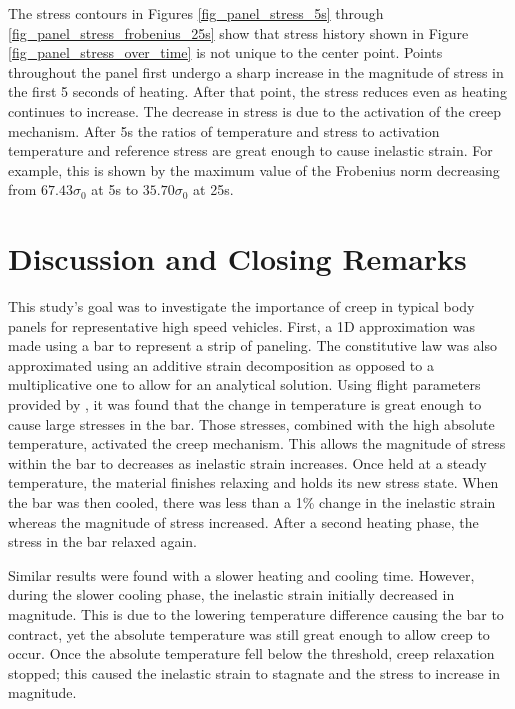\documentclass[conf]{new-aiaa}
\begin{document}
\noindent
The stress contours in Figures \ref{fig_panel_stress_5s} through
\ref{fig_panel_stress_frobenius_25s} show that stress history 
shown in Figure \ref{fig_panel_stress_over_time} is not unique to 
the center point. 
Points throughout the panel first undergo a sharp increase in
the magnitude of stress in the first 5 seconds of heating. 
After that point, the stress reduces even as heating continues to increase.
The decrease in stress is due to the activation of the creep mechanism.
After 5s the ratios of temperature and stress to activation temperature
and reference stress are great enough to cause inelastic strain.
For example, this is shown by the maximum value of the Frobenius norm 
decreasing from $67.43\sigma_0$ at 5s to $35.70\sigma_0$ at 25s.


\section{Discussion and Closing Remarks} \label{sec_closing_remarks}

This study's goal was to investigate the importance of creep in typical 
body panels for representative high speed vehicles.
First, a 1D approximation was made using a bar to represent a strip of
paneling. 
The constitutive law was also approximated using an additive strain decomposition
as opposed to a multiplicative one to allow for an analytical solution.
Using flight parameters provided by 
\cite{culler_impact_of_FTS_coupling_on_response_prediction_hypersonic_skin_panels},
it was found that the change in temperature is great
enough to cause large stresses in the bar. 
Those stresses, combined with the high absolute temperature, activated the creep mechanism.
This allows the magnitude of stress within the bar to decreases as inelastic strain increases. 
Once held at a steady temperature, the material finishes relaxing and holds 
its new stress state. 
When the bar was then cooled, there was less than a 1\% change in the inelastic strain
whereas the magnitude of stress increased. 
After a second heating phase, the stress in the bar relaxed again. 

Similar results were found with a slower heating and cooling time.
However, during the slower cooling phase, the inelastic strain initially decreased in magnitude.
This is due to the lowering temperature difference causing the bar to contract,
yet the absolute temperature was still great enough to allow creep to occur. 
Once the absolute temperature fell below the threshold, creep relaxation 
stopped; this caused the inelastic strain to stagnate and the stress to increase
in magnitude. 
\end{document}

